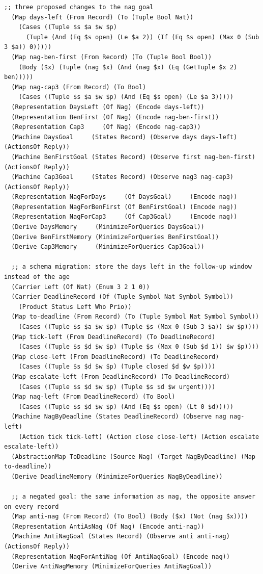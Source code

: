 \documentclass[11pt]{article}
\theoremstyle{definition}
\theoremstyle{plain}
\begin{document}
\begin{lstlisting}[style=mettafull]
  ;; three proposed changes to the nag goal
  (Map days-left (From Record) (To (Tuple Bool Nat))
    (Cases ((Tuple $s $a $w $p)
      (Tuple (And (Eq $s open) (Le $a 2)) (If (Eq $s open) (Max 0 (Sub 3 $a)) 0)))))
  (Map nag-ben-first (From Record) (To (Tuple Bool Bool))
    (Body ($x) (Tuple (nag $x) (And (nag $x) (Eq (GetTuple $x 2) ben)))))
  (Map nag-cap3 (From Record) (To Bool)
    (Cases ((Tuple $s $a $w $p) (And (Eq $s open) (Le $a 3)))))
  (Representation DaysLeft (Of Nag) (Encode days-left))
  (Representation BenFirst (Of Nag) (Encode nag-ben-first))
  (Representation Cap3     (Of Nag) (Encode nag-cap3))
  (Machine DaysGoal     (States Record) (Observe days days-left)       (ActionsOf Reply))
  (Machine BenFirstGoal (States Record) (Observe first nag-ben-first)  (ActionsOf Reply))
  (Machine Cap3Goal     (States Record) (Observe nag3 nag-cap3)        (ActionsOf Reply))
  (Representation NagForDays     (Of DaysGoal)     (Encode nag))
  (Representation NagForBenFirst (Of BenFirstGoal) (Encode nag))
  (Representation NagForCap3     (Of Cap3Goal)     (Encode nag))
  (Derive DaysMemory     (MinimizeForQueries DaysGoal))
  (Derive BenFirstMemory (MinimizeForQueries BenFirstGoal))
  (Derive Cap3Memory     (MinimizeForQueries Cap3Goal))

  ;; a schema migration: store the days left in the follow-up window instead of the age
  (Carrier Left (Of Nat) (Enum 3 2 1 0))
  (Carrier DeadlineRecord (Of (Tuple Symbol Nat Symbol Symbol))
    (Product Status Left Who Prio))
  (Map to-deadline (From Record) (To (Tuple Symbol Nat Symbol Symbol))
    (Cases ((Tuple $s $a $w $p) (Tuple $s (Max 0 (Sub 3 $a)) $w $p))))
  (Map tick-left (From DeadlineRecord) (To DeadlineRecord)
    (Cases ((Tuple $s $d $w $p) (Tuple $s (Max 0 (Sub $d 1)) $w $p))))
  (Map close-left (From DeadlineRecord) (To DeadlineRecord)
    (Cases ((Tuple $s $d $w $p) (Tuple closed $d $w $p))))
  (Map escalate-left (From DeadlineRecord) (To DeadlineRecord)
    (Cases ((Tuple $s $d $w $p) (Tuple $s $d $w urgent))))
  (Map nag-left (From DeadlineRecord) (To Bool)
    (Cases ((Tuple $s $d $w $p) (And (Eq $s open) (Lt 0 $d)))))
  (Machine NagByDeadline (States DeadlineRecord) (Observe nag nag-left)
    (Action tick tick-left) (Action close close-left) (Action escalate escalate-left))
  (AbstractionMap ToDeadline (Source Nag) (Target NagByDeadline) (Map to-deadline))
  (Derive DeadlineMemory (MinimizeForQueries NagByDeadline))

  ;; a negated goal: the same information as nag, the opposite answer on every record
  (Map anti-nag (From Record) (To Bool) (Body ($x) (Not (nag $x))))
  (Representation AntiAsNag (Of Nag) (Encode anti-nag))
  (Machine AntiNagGoal (States Record) (Observe anti anti-nag) (ActionsOf Reply))
  (Representation NagForAntiNag (Of AntiNagGoal) (Encode nag))
  (Derive AntiNagMemory (MinimizeForQueries AntiNagGoal))


\end{lstlisting}
\end{document}
